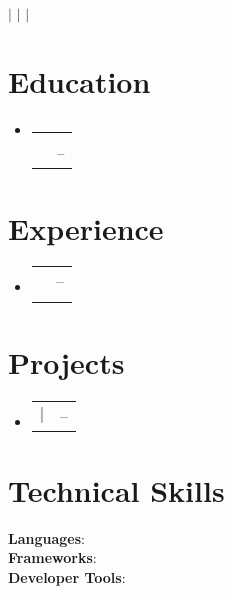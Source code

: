 \documentclass[letterpaper,11pt]{article}
\makeatletter
\newcommand{\resumeSubheading}[4]{%
  \vspace{-2pt}\item
  \begin{tabular*}{0.97\textwidth}[t]{l@{\extracolsep{\fill}}r}
    \textbf{#1} & #2 \\
    \textit{\small #3} & \textit{\small #4} \\
  \end{tabular*}\vspace{-7pt}
}
\newcommand{\resumeProjectHeading}[2]{%
  \item
  \begin{tabular*}{0.97\textwidth}{l@{\extracolsep{\fill}}r}
    \small #1 & #2 \\
  \end{tabular*}\vspace{-7pt}
}
\newcommand{\resumeSubHeadingListStart}{\begin{itemize}[leftmargin=0.15in, label={}]}
\newcommand{\resumeSubHeadingListEnd}{\end{itemize}}
\makeatother
\begin{document}
\begin{center}
\textbf{\Huge \scshape } \\ 
\vspace{1pt}
\small  $|$ 
\href{mailto:}{\underline{}} $|$ 
\href{}{\underline{}} $|$ 
\href{}{\underline{}}
\end{center}

\section{Education}
\resumeSubHeadingListStart
\resumeSubheading
  {}{}
  {}{ -- }
\resumeSubHeadingListEnd

\section{Experience}
\resumeSubHeadingListStart
\resumeSubheading
  {}{ -- }
  {}{}
\resumeSubHeadingListEnd

\section{Projects}
\resumeSubHeadingListStart
\resumeProjectHeading
  {\textbf{} $|$ \emph{}}{ -- }
\resumeSubHeadingListEnd

\section{Technical Skills}
\begin{itemize}[leftmargin=0.15in, label={}]
\small{
  \item{
    \textbf{Languages}:  \\
    \textbf{Frameworks}:  \\
    \textbf{Developer Tools}:  \\
  }
}
\end{itemize}
\end{document}
